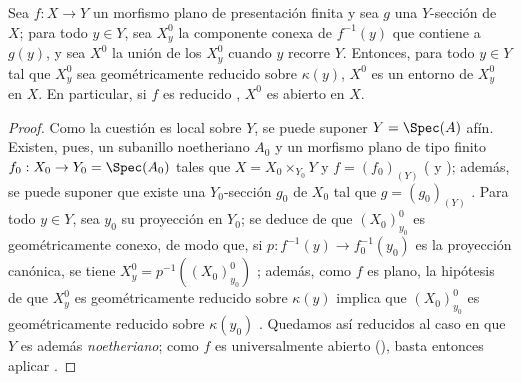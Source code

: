 \begin{corollary}[15.6.5]
\label{IV.15.6.5}
Sea $f:X\to Y$ un morfismo plano de presentación finita y sea $g$ una $Y$-sección de $X$; para todo $y\in Y$, sea $X_y^0$ la componente conexa de $f^{-1}(y)$ que contiene a $g(y)$, y sea $X^0$ la unión de los $X_y^0$ cuando $y$ recorre $Y$.
Entonces, para todo $y\in Y$ tal que $X_y^0$ sea geométricamente reducido sobre $\kappa(y)$, $X^0$ es un entorno de $X_y^0$ en $X$.
En particular, si $f$ es reducido , $X^0$ es abierto en $X$.
\end{corollary}

\begin{proof}
Como la cuestión es local sobre $Y$, se puede suponer $Y=\Spec(A)$ afín.
Existen, pues, un subanillo noetheriano $A_0$ y un morfismo plano de tipo finito $f_0:X_0\to Y_0=\Spec(A_0)$ tales que $X=X_0\times_{Y_0}Y$ y $f=(f_0)_{(Y)}$ ( y ); además, se puede suponer que existe una $Y_0$-sección $g_0$ de $X_0$ tal que $g=(g_0)_{(Y)}$ .
Para todo $y\in Y$, sea $y_0$ su proyección en $Y_0$; se deduce de  que $(X_0)_{y_0}^0$ es geométricamente conexo, de modo que, si $p:f^{-1}(y)\to f_0^{-1}(y_0)$ es la proyección canónica, se tiene $X_y^0=p^{-1}((X_0)_{y_0}^0)$ ; además, como $f$ es plano, la hipótesis de que $X_y^0$ es geométricamente reducido sobre $\kappa(y)$ implica que $(X_0)_{y_0}^0$ es geométricamente reducido sobre $\kappa(y_0)$ .
Quedamos así reducidos al caso en que
$Y$ es además \emph{noetheriano}; como $f$ es universalmente abierto (), basta entonces aplicar .
\end{proof}

